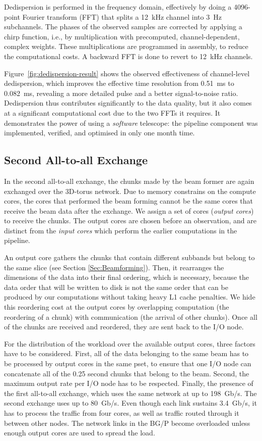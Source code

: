 \documentclass{llncs}
\begin{document}
Dedispersion is performed in the frequency domain, effectively by doing a 4096-point Fourier transform (FFT) that splits a 12~kHz channel into 3~Hz subchannels. The phases of the observed samples are corrected by applying a chirp function, i.e., by multiplication with precomputed, channel-dependent, complex weights. These multiplications are programmed in assembly, to reduce the computational costs. A backward FFT is done to revert to 12~kHz channels.

Figure~\ref{fig:dedispersion-result} shows the observed effectiveness of channel-level dedispersion, which improves the effective time resolution from 0.51~ms to 0.082~ms, revealing a more detailed pulse and a better signal-to-noise ratio. Dedispersion thus contributes significantly to the data quality, but it also comes at a significant computational cost due to the two FFTs it requires. It demonstrates the power of using a \emph{software\/} telescope: the pipeline component was implemented, verified, and optimised in only one month time.

\subsection{Second All-to-all Exchange}

In the second all-to-all exchange, the chunks made by the beam former are again exchanged over the 3D-torus network. Due to memory constrains on the compute cores, the cores that performed the beam forming cannot be the same cores that receive the beam data after the exchange. We assign a set of cores (\emph{output cores}) to receive the chunks. The output cores are chosen before an observation, and are distinct from the \emph{input cores} which perform the earlier computations in the pipeline.

An output core gathers the chunks that contain different subbands but belong to the same slice (see Section \ref{Sec:Beamforming}). Then, it rearranges the dimensions of the data into their final ordering, which is necessary, because the data order that will be written to disk is not the same order that can be produced by our computations without taking heavy L1 cache penalties. We hide this reordering cost at the output cores by overlapping computation (the reordering of a chunk) with communication (the arrival of other chunks). Once all of the chunks are received and reordered, they are sent back to the I/O node.

For the distribution of the workload over the available output cores, three factors have to be considered. First, all of the data belonging to the same beam has to be processed by output cores in the same pset, to ensure that one I/O node can concatenate all of the 0.25 second chunks that belong to the beam. Second, the maximum output rate per I/O node has to be respected. Finally, the presence of the first all-to-all exchange, which uses the same network at up to 198~Gb/s. The second exchange uses up to 80~Gb/s. Even though each link sustains 3.4~Gb/s, it has to process the traffic from four cores, as well as traffic routed through it between other nodes. The network links in the BG/P become overloaded unless enough output cores are used to spread the load.
\end{document}
